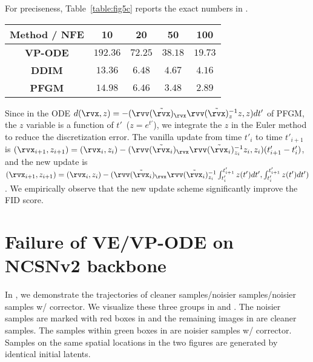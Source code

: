 For preciseness, Table~\ref{table:fig5c} reports the exact numbers in . 
\begin{table*}[htb]
\begin{center}
\caption{The FID scores in  of different methods and NFE.}
\label{table:fig5c}
\begin{tabular}{c c c c c}
		\toprule
		\textbf{Method / NFE} &  10 & 20 & 50 & 100\\
		\midrule
			\textbf{VP-ODE} & $192.36$& $72.25$ &$38.18$& $19.73$\\
			\textbf{DDIM} &$13.36$& $6.48$& $4.67$& $4.16$\\
        	\textbf{PFGM} &  $14.98$ & $6.46$& $3.48$ & $2.89$ \\
        \bottomrule
\end{tabular}
\end{center}
\end{table*}

Since in the ODE $ {d(\rvx,z)} = -(\rvv(\tilde{\rvx})_\rvx\rvv(\tilde{\rvx})_z^{-1}z, z){dt'}$ of PFGM, the $z$ variable is a function of $t'$~($z=e^{t'}$), we integrate the $z$ in the Euler method to reduce the discretization error. The vanilla update from time $t'_i$ to time $t'_{i+1}$ is ${(\rvx_{i+1},z_{i+1})} = (\rvx_{i},z_{i})-(\rvv(\tilde{\rvx}_i)_\rvx\rvv(\tilde{\rvx}_i)_{z_i}^{-1}z_i, z_i)(t'_{i+1}-t'_i)$, and the new update is ${(\rvx_{i+1},z_{i+1})} = (\rvx_{i},z_{i})-(\rvv(\tilde{\rvx}_i)_\rvx\rvv(\tilde{\rvx}_i)_{z_i}^{-1}\int_{t'_i}^{t'_{i+1}}z(t')dt', \int_{t'_i}^{t'_{i+1}} z(t')dt')$. We empirically observe that the new update scheme significantly improve the FID score.

\section{Failure of VE/VP-ODE on NCSNv2 backbone}
\label{app:failure}

In , we demonstrate the trajectories of cleaner samples/noisier samples/noisier samples w/ corrector. We visualize these three groups in  and . The noisier samples are marked with red boxes in  and the remaining images in  are cleaner samples. The samples within green boxes in  are noisier samples w/ corrector. Samples on the same spatial locations in the two figures are generated by identical initial latents. 

